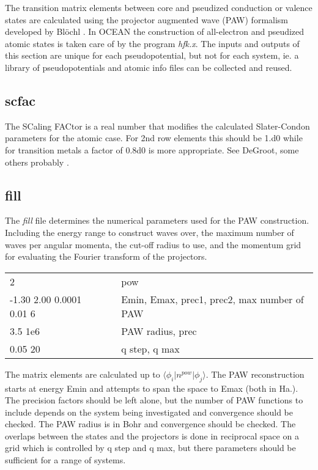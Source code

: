 \documentclass[12pt]{article}
\begin{document}
The transition matrix elements between core and pseudized conduction or valence states are calculated 
using the projector augmented wave (PAW) formalism developed by Bl\"{o}chl \cite{Bloechl}. In OCEAN
the construction of all-electron and pseudized atomic states is taken care of by the program \emph{hfk.x}. 
The inputs and outputs of this section are unique for each pseudopotential, but not for each system, ie. 
a library of pseudopotentials and atomic info files can be collected and reused.


\subsection{scfac}
The SCaling FACtor is a real number that modifies the calculated Slater-Condon parameters for the atomic case. For 2nd row elements this should be 1.d0 while for transition metals a factor of 0.8d0 is more appropriate. See DeGroot, some others probably \cite{SCFAR}.

\subsection{fill}
The \emph{fill} file determines the numerical parameters used for the PAW construction. Including the energy range to construct waves over, the maximum number of waves per angular momenta, the cut-off radius to use, and the momentum grid for evaluating the Fourier transform of the projectors. 

\begin{center}
\begin{tabular}{| l | c l |}
\hline
2						& &  pow \\
-1.30 2.00 0.0001 0.01 6		& & Emin, Emax, prec1, prec2, max number of PAW \\
3.5 1e6					& & PAW radius, prec \\
0.05 20					& & q step, q max \\
\hline
\end{tabular}
\end{center}

The matrix elements are calculated up to $\langle \phi_i \vert n^{pow} \vert \phi_j \rangle$. The PAW reconstruction starts at energy Emin and attempts to span the space to Emax (both in Ha.). The precision factors should be left alone, but the number of PAW functions to include depends on the system being investigated and convergence should be checked. The PAW radius is in Bohr and convergence should be checked. The overlaps between the states and the projectors is done in reciprocal space on a grid which is controlled by q step and q max, but there parameters should be sufficient for a range of systems.
\end{document}
